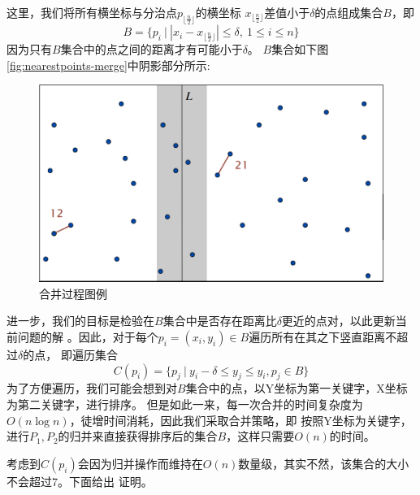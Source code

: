 这里，我们将所有横坐标与分治点$p_{\lfloor\frac{n}{2}\rfloor}$的横坐标
$x_{\lfloor\frac{n}{2}\rfloor}$差值小于$\delta$的点组成集合$B$，即
\begin{equation*}
	B = \{p_i\ \big|\
	\left|x_i - x_{\lfloor\frac{n}{2}\rfloor}\right| \le \delta ,\
	1 \le i \le n\}
\end{equation*}
因为只有$B$集合中的点之间的距离才有可能小于$\delta$。
$B$集合如下图\autoref{fig:nearestpoints-merge}中阴影部分所示:
\begin{figure}[htb]
	\centering
	\includegraphics[scale=0.5]{image/NearestPointsMerge.png}
  \caption{合并过程图例}\label{fig:nearestpoints-merge}
\end{figure}

进一步，我们的目标是检验在$B$集合中是否存在距离比$\delta$更近的点对，以此更新当前问题的解
。因此，对于每个$p_i = (x_i, y_i) \in B$遍历所有在其之下竖直距离不超过$\delta$的点，
即遍历集合
\begin{equation*}
	C(p_i) = \{ p_j\ \big|\ y_i - \delta \le y_j \le y_i, p_j \in B \}
\end{equation*}
为了方便遍历，我们可能会想到对$B$集合中的点，以Y坐标为第一关键字，X坐标为第二关键字，进行排序。
但是如此一来，每一次合并的时间复杂度为$O(n \log n)$，徒增时间消耗，因此我们采取合并策略，即
按照Y坐标为关键字，进行$P_1, P_2$的归并来直接获得排序后的集合$B$，这样只需要$O(n)$的时间。

考虑到$C(p_i)$会因为归并操作而维持在$O(n)$数量级，其实不然，该集合的大小不会超过7。下面给出
证明。

